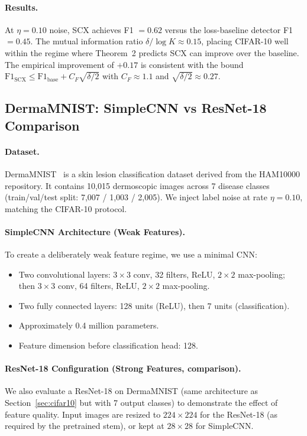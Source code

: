 \documentclass[article]{amsart}
\theoremstyle{definition}
\begin{document}
\paragraph{Results.}
At $\eta = 0.10$ noise, SCX achieves F1 $= 0.62$ versus the loss-baseline detector F1 $= 0.45$. The mutual information ratio $\delta / \log K \approx 0.15$, placing CIFAR-10 well within the regime where Theorem~2 predicts SCX can improve over the baseline. The empirical improvement of $+0.17$ is consistent with the bound $\mathrm{F1}_{\mathrm{SCX}} \leq \mathrm{F1}_{\mathrm{base}} + C_F \sqrt{\delta/2}$ with $C_F \approx 1.1$ and $\sqrt{\delta/2} \approx 0.27$.

\subsection{DermaMNIST: SimpleCNN vs ResNet-18 Comparison}

\paragraph{Dataset.}
DermaMNIST~\cite{yang2023medmnist} is a skin lesion classification dataset derived from the HAM10000 repository. It contains 10,015 dermoscopic images across 7 disease classes (train/val/test split: 7,007 / 1,003 / 2,005). We inject label noise at rate $\eta = 0.10$, matching the CIFAR-10 protocol.

\paragraph{SimpleCNN Architecture (Weak Features).}
To create a deliberately weak feature regime, we use a minimal CNN:
\begin{itemize}
    \item Two convolutional layers: $3 \times 3$ conv, 32 filters, ReLU, $2 \times 2$ max-pooling; then $3 \times 3$ conv, 64 filters, ReLU, $2 \times 2$ max-pooling.
    \item Two fully connected layers: 128 units (ReLU), then 7 units (classification).
    \item Approximately 0.4 million parameters.
    \item Feature dimension before classification head: 128.
\end{itemize}

\paragraph{ResNet-18 Configuration (Strong Features, comparison).}
We also evaluate a ResNet-18 on DermaMNIST (same architecture as Section~\ref{sec:cifar10} but with 7 output classes) to demonstrate the effect of feature quality. Input images are resized to $224 \times 224$ for the ResNet-18 (as required by the pretrained stem), or kept at $28 \times 28$ for SimpleCNN.
\end{document}
